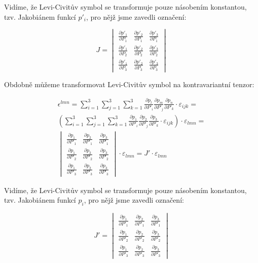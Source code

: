 Vidíme, že Levi-Civitův symbol se transformuje pouze násobením konstantou, tzv. Jakobiánem funkcí \(p'_i\), pro nějž jsme zavedli označení:

\begin{equation}
J = 
\begin{vmatrix}
  \frac{\partial p'_1}{\partial P_1} & \frac{\partial p'_2}{\partial P_1} & \frac{\partial p'_3}{\partial P_1} \\
  \frac{\partial p'_1}{\partial P_2} & \frac{\partial p'_2}{\partial P_2} & \frac{\partial p'_3}{\partial P_2} \\
  \frac{\partial p'_1}{\partial P_3} & \frac{\partial p'_2}{\partial P_3} & \frac{\partial p'_3}{\partial P_3}
\end{vmatrix}
\end{equation}

Obdobně můžeme transformovat Levi-Civitův symbol na kontravariantní tenzor:

\begin{equation}
\begin{split}
\epsilon^{lmn} = \sum_{i=1}^3 \sum_{j=1}^3 \sum_{k=1}^3 \frac{\partial p_l}{\partial P'_i} \frac{\partial p_m}{\partial P'_j} \frac{\partial p_n}{\partial P'_k} \cdot \varepsilon_{ijk} = \\
\left(\sum_{i=1}^3 \sum_{j=1}^3 \sum_{k=1}^3 \frac{\partial p_1}{\partial P'_i} \frac{\partial p_2}{\partial P'_j} \frac{\partial p_3}{\partial P'_k} \cdot \varepsilon_{ijk} \right) \cdot \varepsilon_{lmn} = \\
\begin{vmatrix}
  \frac{\partial p_1}{\partial P'_1} & \frac{\partial p_2}{\partial P'_1} & \frac{\partial p_3}{\partial P'_1} \\
  \frac{\partial p_1}{\partial P'_2} & \frac{\partial p_2}{\partial P'_2} & \frac{\partial p_3}{\partial P'_2} \\
  \frac{\partial p_1}{\partial P'_3} & \frac{\partial p_2}{\partial P'_3} & \frac{\partial p_3}{\partial P'_3}
\end{vmatrix}
\cdot \varepsilon_{lmn}  = J' \cdot \varepsilon_{lmn}
\end{split}
\end{equation}

Vidíme, že Levi-Civitův symbol se transformuje pouze násobením konstantou, tzv. Jakobiánem funkcí \(p_i\), pro nějž jsme zavedli označení:

\begin{equation}
J' = \begin{vmatrix}
  \frac{\partial p_1}{\partial P'_1} & \frac{\partial p_2}{\partial P'_1} & \frac{\partial p_3}{\partial P'_1} \\
  \frac{\partial p_1}{\partial P'_2} & \frac{\partial p_2}{\partial P'_2} & \frac{\partial p_3}{\partial P'_2} \\
  \frac{\partial p_1}{\partial P'_3} & \frac{\partial p_2}{\partial P'_3} & \frac{\partial p_3}{\partial P'_3}
\end{vmatrix}
\end{equation}

